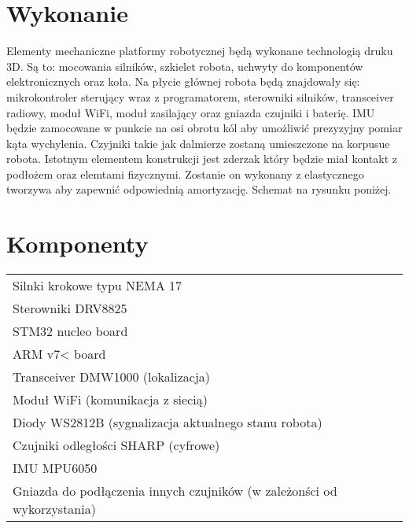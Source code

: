 \documentclass[a4paper, 12pt]{article}
\begin{document}
\section{Wykonanie}
Elementy mechaniczne platformy robotycznej będą wykonane technologią druku 3D. Są to: mocowania silników, szkielet robota, uchwyty do komponentów elektronicznych oraz koła. Na płycie głównej robota będą znajdowały się: mikrokontroler sterujący wraz z programatorem, sterowniki silników, transceiver radiowy, moduł WiFi, moduł zasilający oraz gniazda czujniki i baterię. IMU będzie zamocowane w punkcie na osi obrotu kól aby umożliwić prezyzyjny pomiar kąta wychylenia. Czyjniki takie jak dalmierze zostaną umieszczone na korpusue robota. Istotnym elementem konstrukcji jest zderzak który będzie miał kontakt z podłożem oraz elemtami fizycznymi. Zostanie on wykonany z elastycznego tworzywa aby zapewnić odpowiednią amortyzację. Schemat na rysunku poniżej. 

\section{Komponenty}
\begin{table}[ht]
	\normalsize
	\begin{tabular}{ll}

    Silnki krokowe typu NEMA 17\\
    Sterowniki DRV8825\\
    STM32 nucleo board\\
    ARM v7< board\\
    Transceiver DMW1000 (lokalizacja)\\
    Moduł WiFi (komunikacja z siecią)\\
    Diody WS2812B (sygnalizacja aktualnego stanu robota)\\
    Czujniki odległości SHARP (cyfrowe)\\
    IMU MPU6050\\
    Gniazda do podłączenia innych czujników (w zależonści od wykorzystania)\\
    
	\end{tabular}
\end{table}


	
\end{document}
